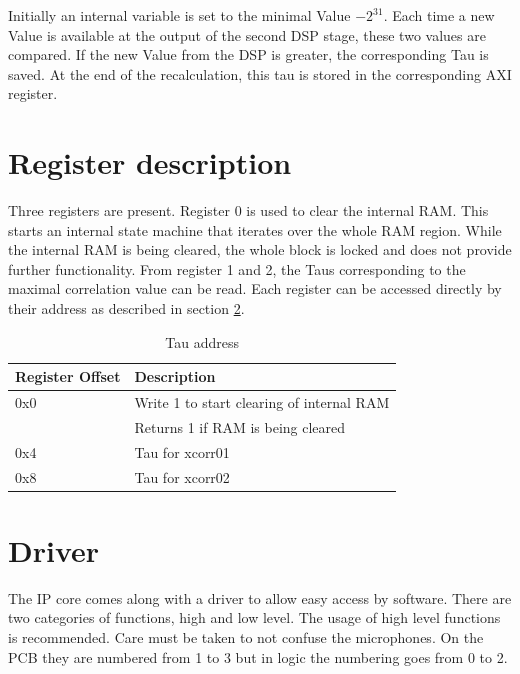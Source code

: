 Initially an internal variable is set to the minimal Value $-2^{31}$.
Each time a new Value is available at the output of the second DSP stage, these two values are compared.
If the new Value from the DSP is greater, the corresponding Tau is saved.
At the end of the recalculation, this tau is stored in the corresponding AXI register.
\section{Register description}
\label{sec::registers}
Three registers are present.
Register 0 is used to clear the internal RAM.
This starts an internal state machine that iterates over the whole RAM region.
While the internal RAM is being cleared, the whole block is locked and does not provide further functionality.
From register 1 and 2, the Taus corresponding to the maximal correlation value can be read.
Each register can be accessed directly by their address as described in section \ref{sec::driver}.

\begin{table}[h]
	\centering
	\begin{tabular}{|l|l|}
		\hline 
		Register Offset &  Description \\
		\hline 
		0x0	&  Write 1 to start clearing of internal RAM \\
		& Returns 1 if RAM is being cleared \\
		\hline 
		0x4	&  Tau for xcorr01\\
		\hline 
		0x8 & Tau for xcorr02 \\
		\hline
	\end{tabular} 
	\caption{Tau address}
	\label{tbl::tau_addr}
\end{table}

\section{Driver}
\label{sec::driver}

The IP core comes along with a driver to allow easy access by software.
There are two categories of functions, high and low level.
The usage of high level functions is recommended.
Care must be taken to not confuse the microphones. 
On the PCB they are numbered from 1 to 3 but in logic the numbering goes from 0 to 2.

